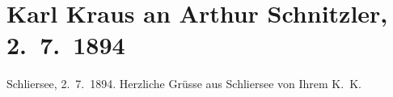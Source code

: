 

         \renewcommand{\erwaehnteOrte}{Orte: Schliersee, Wien}
         \renewcommand{\erwaehnteWerke}{}
               \section[Karl Kraus an Arthur Schnitzler, 2. 7. 1894]{ Karl Kraus an Arthur Schnitzler, 2. 7. 1894}\nopagebreak{}\rehead{ }\begin{ledgroupsized}[t]{13cm}\normalsize\beginnumbering \toendnotes[C]{\smallbreak\pagebreak[2]} 
\pstart
           {\pb}Schliersee,
                            2. 7. 1894.\pend
           \pstart
           Herzliche Grüsse aus Schliersee von
                    Ihrem \spacefill\mbox{K. K.}\pend
           
         
         \endnumbering{}\end{ledgroupsized}  \newcommand{\dateiname}{L00345}\newcommand{\titel}{Karl Kraus an Arthur Schnitzler, 2. 7. 1894}\newcommand{\editorInnen}{Martin Anton Müller und Gerd-Hermann Susen}
      